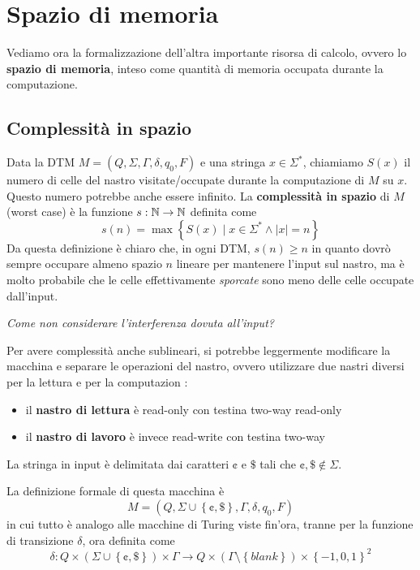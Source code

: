 \section{Spazio di memoria}

Vediamo ora la formalizzazione dell'altra importante risorsa di calcolo, ovvero lo \textbf{spazio di memoria}, inteso come quantità di memoria occupata durante la computazione.

\subsection{Complessità in spazio}
Data la DTM $M = (Q, \Sigma, \Gamma, \delta, q_0, F)$ e una stringa $x \in \Sigma^\ast$, chiamiamo $S(x)$ il numero di celle del nastro visitate/occupate durante la computazione di $M$ su $x$. Questo numero potrebbe anche essere infinito. La \textbf{complessità in spazio} di $M$ (worst case) è la funzione $s: \mathbb{N} \rightarrow \mathbb{N}$ definita come
$$s(n) = \max \left\{S(x) \mid x \in \Sigma^\ast \wedge |x| = n \right\}$$
Da questa definizione è chiaro che, in ogni DTM, $s(n) \geq n$ in quanto dovrò sempre occupare almeno spazio $n$ lineare per mantenere l'input sul nastro, ma è molto probabile che le celle effettivamente \textit{sporcate} sono meno delle celle occupate dall'input.

\textit{Come non considerare l'interferenza dovuta all'input?}

Per avere complessità anche sublineari, si potrebbe leggermente modificare la macchina e separare le operazioni del nastro, ovvero utilizzare due nastri diversi per la lettura e per la computazion : 
\begin{itemize}
	\item il \textbf{nastro di lettura} è read-only con testina two-way read-only
	\item il \textbf{nastro di lavoro} è invece read-write con testina two-way
\end{itemize}

La stringa in input è delimitata dai caratteri $\cent$ e $\$$ tali che $\cent, \$ \notin \Sigma$. 

La definizione formale di questa macchina è 
$$ M = \left(Q, \Sigma \cup \left\{\cent, \$\right\}, \Gamma, \delta, q_0, F \right) $$
in cui tutto è analogo alle macchine di Turing viste fin'ora, tranne per la funzione di transizione $\delta$, ora definita come
$$ \delta: Q \times \left(\Sigma \cup \left\{\cent, \$ \right\}\right) \times \Gamma \rightarrow Q \times \left(\Gamma \setminus \left\{blank\right\}\right) \times \left\{-1, 0, 1\right\}^2 $$

